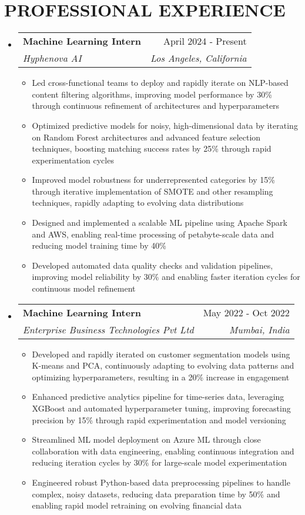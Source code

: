 \documentclass[letterpaper,11pt]{article}
\makeatletter
\newcommand{\resumeItem}[1]{
  \item\small{
    {#1 \vspace{-2pt}}
  }
}
\newcommand{\resumeSubheading}[4]{
  \vspace{-1pt}\item
    \begin{tabular*}{0.97\textwidth}[t]{l@{\extracolsep{\fill}}r}
      \textbf{#1} & #2 \\
      \textit{\small#3} & \textit{\small #4} \\
    \end{tabular*}\vspace{-5pt}
}
\newcommand{\resumeSubHeadingListStart}{\begin{itemize}[leftmargin=0.15in, label={}]}
\newcommand{\resumeSubHeadingListEnd}{\end{itemize}}
\newcommand{\resumeItemListStart}{\begin{itemize}}
\newcommand{\resumeItemListEnd}{\end{itemize}\vspace{-5pt}}
\makeatother
\begin{document}
\section{\textbf{PROFESSIONAL EXPERIENCE}}
  \resumeSubHeadingListStart
    \resumeSubheading
      {Machine Learning Intern}{April 2024 - Present}
      {Hyphenova AI}{Los Angeles, California}
      \resumeItemListStart
        \resumeItem{Led cross-functional teams to deploy and rapidly iterate on NLP-based content filtering algorithms, improving model performance by 30\% through continuous refinement of architectures and hyperparameters}
        \resumeItem{Optimized predictive models for noisy, high-dimensional data by iterating on Random Forest architectures and advanced feature selection techniques, boosting matching success rates by 25\% through rapid experimentation cycles}
        \resumeItem{Improved model robustness for underrepresented categories by 15\% through iterative implementation of SMOTE and other resampling techniques, rapidly adapting to evolving data distributions}
        \resumeItem{Designed and implemented a scalable ML pipeline using Apache Spark and AWS, enabling real-time processing of petabyte-scale data and reducing model training time by 40\%}
        \resumeItem{Developed automated data quality checks and validation pipelines, improving model reliability by 30\% and enabling faster iteration cycles for continuous model refinement}
      \resumeItemListEnd
    
    \resumeSubheading
      {Machine Learning Intern}{May 2022 - Oct 2022}
      {Enterprise Business Technologies Pvt Ltd}{Mumbai, India}
      \resumeItemListStart
        \resumeItem{Developed and rapidly iterated on customer segmentation models using K-means and PCA, continuously adapting to evolving data patterns and optimizing hyperparameters, resulting in a 20\% increase in engagement}
        \resumeItem{Enhanced predictive analytics pipeline for time-series data, leveraging XGBoost and automated hyperparameter tuning, improving forecasting precision by 15\% through rapid experimentation and model versioning}
        \resumeItem{Streamlined ML model deployment on Azure ML through close collaboration with data engineering, enabling continuous integration and reducing iteration cycles by 30\% for large-scale model experimentation}
        \resumeItem{Engineered robust Python-based data preprocessing pipelines to handle complex, noisy datasets, reducing data preparation time by 50\% and enabling rapid model retraining on evolving financial data}
      \resumeItemListEnd
  \resumeSubHeadingListEnd
\end{document}
